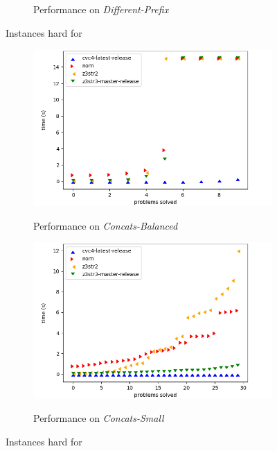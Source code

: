 \begin{figure}[h]
\begin{subfigure}{.5\textwidth}
        \caption{Performance on \textit{Different-Prefix}}
        \label{fig:different-prefix}
    \end{subfigure}
    \caption{Instances hard for \cvc{}}
    \label{fig:cvc-hard}
    \bigskip
    \begin{subfigure}{.5\textwidth}
        \includegraphics[width=\textwidth]{data/graphs/concats-balanced.png}
        \label{fig:concats-balanced}
        \caption{Performance on \textit{Concats-Balanced}}
    \end{subfigure}
    \begin{subfigure}{.5\textwidth}
        \includegraphics[width=\textwidth]{data/graphs/concats-small.png}
        \label{fig:concats-small}
        \caption{Performance on \textit{Concats-Small}}
    \end{subfigure}
    \caption{Instances hard for \us{}}
    \label{fig:z3str3-hard}
\end{figure}

